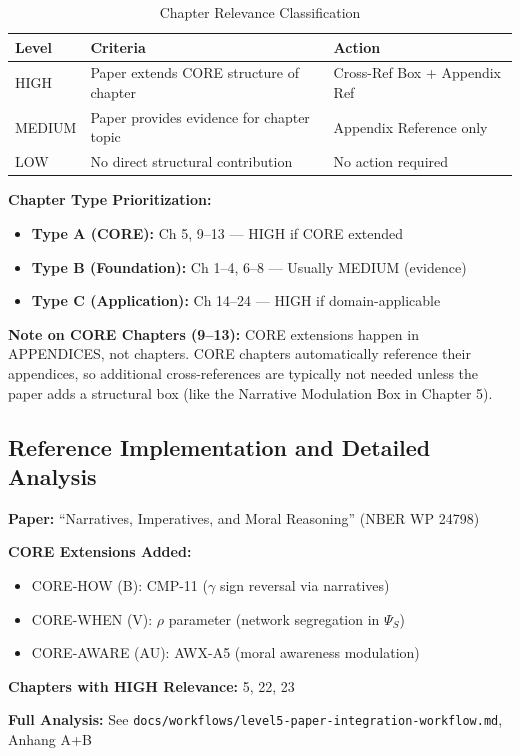 \begin{table}[htbp]
\centering
\caption{Chapter Relevance Classification}
\label{tab:chapter-relevance}
\begin{tabular}{@{}lp{6cm}l@{}}
\toprule
\textbf{Level} & \textbf{Criteria} & \textbf{Action} \\
\midrule
HIGH & Paper extends CORE structure of chapter & Cross-Ref Box + Appendix Ref \\
MEDIUM & Paper provides evidence for chapter topic & Appendix Reference only \\
LOW & No direct structural contribution & No action required \\
\bottomrule
\end{tabular}
\end{table}

\textbf{Chapter Type Prioritization:}
\begin{itemize}
    \item \textbf{Type A (CORE):} Ch 5, 9--13 --- HIGH if CORE extended
    \item \textbf{Type B (Foundation):} Ch 1--4, 6--8 --- Usually MEDIUM (evidence)
    \item \textbf{Type C (Application):} Ch 14--24 --- HIGH if domain-applicable
\end{itemize}

\textbf{Note on CORE Chapters (9--13):} CORE extensions happen in APPENDICES, not chapters. CORE chapters automatically reference their appendices, so additional cross-references are typically not needed unless the paper adds a structural box (like the Narrative Modulation Box in Chapter 5).

\subsection{Reference Implementation and Detailed Analysis}
\label{sec:paperint-reference-impl}

\begin{tcolorbox}[colback=green!5!white, colframe=green!60!black,
    title=Reference Implementation: Bénabou, Falk \& Tirole (2018)]
\textbf{Paper:} ``Narratives, Imperatives, and Moral Reasoning'' (NBER WP 24798)

\textbf{CORE Extensions Added:}
\begin{itemize}
    \item CORE-HOW (B): CMP-11 ($\gamma$ sign reversal via narratives)
    \item CORE-WHEN (V): $\rho$ parameter (network segregation in $\Psi_S$)
    \item CORE-AWARE (AU): AWX-A5 (moral awareness modulation)
\end{itemize}

\textbf{Chapters with HIGH Relevance:} 5, 22, 23

\textbf{Full Analysis:} See \texttt{docs/workflows/level5-paper-integration-workflow.md}, Anhang A+B
\end{tcolorbox}

